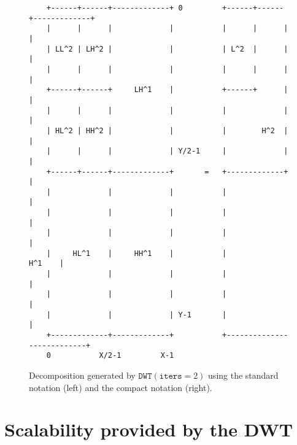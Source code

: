 \begin{figure}
\begin{verbatim}
    +------+------+-------------+ 0         +------+------+-------------+
    |      |      |             |           |      |      |             |
    | LL^2 | LH^2 |             |           | L^2  |      |             |
    |      |      |             |           |      |      |             |
    +------+------+     LH^1    |           +------+      |             |
    |      |      |             |           |             |             |
    | HL^2 | HH^2 |             |           |        H^2  |             |
    |      |      |             | Y/2-1     |             |             |
    +------+------+-------------+       =   +-------------+             |
    |             |             |           |                           |
    |             |             |           |                           |
    |             |             |           |                           |
    |     HL^1    |     HH^1    |           |                    H^1    |
    |             |             |           |                           |
    |             |             |           |                           |
    |             |             | Y-1       |                           |
    +-------------+-------------+           +---------------------------+
    0           X/2-1         X-1
\end{verbatim}
\caption{Decomposition generated by $\mathtt{DWT}(\mathtt{iters}=2)$ using the standard notation (left) and the compact notation (right).}
\label{fig:2-levels_DWT}
\end{figure}


\section{Scalability provided by the DWT}

